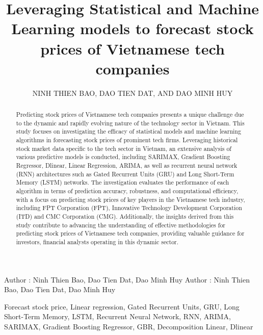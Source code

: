 \documentclass{ieeeojies}
\begin{document}
\raggedbottom
\title{Leveraging Statistical and Machine Learning models to forecast stock prices of Vietnamese tech companies}

\author{\uppercase{Ninh Thien Bao},
    \uppercase{Dao Tien Dat, and Dao Minh Huy}}

\address[1]{Faculty of Information Systems, University of Information Technology, (e-mail: 21520621@gm.uit.edu.vn)}
\address[2]{Faculty of Information Systems, University of Information Technology, (e-mail: 21521930@gm.uit.edu.vn)}
\address[3]{Faculty of Information Systems, University of Information Technology, (e-mail: 21520912@gm.uit.edu.vn)}

\markboth
{Author \headeretal: Ninh Thien Bao, Dao Tien Dat, Dao Minh Huy}
{Author \headeretal: Ninh Thien Bao, Dao Tien Dat, Dao Minh Huy}

\begin{abstract}
    Predicting stock prices of Vietnamese tech companies presents a unique challenge due to the dynamic and rapidly evolving nature of the technology sector in Vietnam. This study focuses on investigating the efficacy of statistical models and machine learning algorithms in forecasting stock prices of prominent tech firms. Leveraging historical stock market data specific to the tech sector in Vietnam, an extensive analysis of various predictive models is conducted, including SARIMAX, Gradient Boosting Regressor, Dlinear, Linear Regression, ARIMA, as well as recurrent neural network (RNN) architectures such as Gated Recurrent Units (GRU) and Long Short-Term Memory (LSTM) networks. The investigation evaluates the performance of each algorithm in terms of prediction accuracy, robustness, and computational efficiency, with a focus on predicting stock prices of key players in the Vietnamese tech industry, including FPT Corporation (FPT), Innovative Technology Development Corporation (ITD) and CMC Corporation (CMG). Additionally, the insights derived from this study contribute to advancing the understanding of effective methodologies for predicting stock prices of Vietnamese tech companies, providing valuable guidance for investors, financial analysts operating in this dynamic sector.
\end{abstract}

\begin{keywords}
    Forecast stock price, Linear regression, Gated Recurrent Units, GRU, Long Short-Term Memory, LSTM, Recurrent Neural Network, RNN, ARIMA, SARIMAX, Gradient Boosting Regressor, GBR, Decomposition Linear, Dlinear
\end{keywords}
\end{document}
